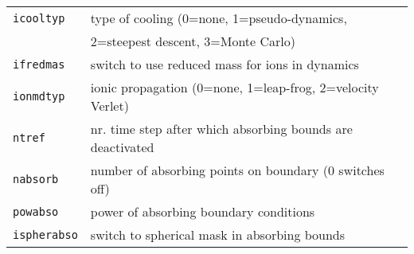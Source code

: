 \documentclass[11pt,a4paper]{article}
\begin{document}
\begin{table}[h]
\begin{tabular}{|p{3.5cm}|p{11.2cm}|}
					\hline
					\texttt{icooltyp}& type of cooling (0=none, 1=pseudo-dynamics,\\
					\texttt{}& 2=steepest descent, 3=Monte Carlo)\\
					\hline
					\texttt{ifredmas}& switch to use reduced mass for ions in dynamics\\
					\hline
					\texttt{ionmdtyp}& ionic propagation (0=none, 1=leap-frog, 2=velocity Verlet)\\
					\hline
					\texttt{ntref}& nr. time step after which absorbing bounds are deactivated\\
					\hline
					\texttt{nabsorb}& number of absorbing points on boundary (0 switches off)\\
					\hline
					\texttt{powabso}& power of absorbing boundary conditions\\
					\hline
					\texttt{ispherabso}& switch to spherical mask in absorbing bounds\\
					\hline
				\end{tabular}
			\end{table}
\end{document}

